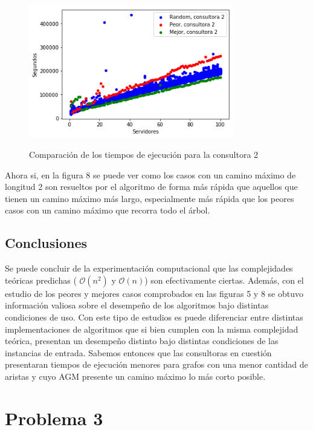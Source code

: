 \documentclass[A4paper,oneside,fleqn,11pt]{article}
\theoremstyle{definition}
\begin{document}
\begin{figure}[H] %
    \includegraphics[width=0.8\textwidth]{graficosEj2/prm2}
    \label{ni se pa que sirve esto}
    \caption{Comparación de los tiempos de ejecución para la consultora 2}
\end{figure}

Ahora si, en la figura 8 se puede ver como los casos con un camino máximo de longitud 2 son resueltos por el algoritmo de forma más rápida que aquellos que tienen un camino máximo más largo, especialmente más rápida que los peores casos con un camino máximo que recorra todo el árbol.

\subsection{Conclusiones}

Se puede concluir de la experimentación computacional que las complejidades teóricas predichas ( $\mathcal{O} (n^2)$ y  $\mathcal{O} (n)$)  son efectivamente ciertas. Además, con el estudio de los peores y mejores casos comprobados en las figuras 5 y 8 se obtuvo información valiosa sobre el desempeño de los algoritmos bajo distintas condiciones de uso. Con este tipo de estudios es puede diferenciar entre distintas implementaciones de algoritmos que si bien cumplen con la misma complejidad teórica, presentan un desempeño distinto bajo distintas condiciones de las instancias de entrada. Sabemos entonces que las consultoras en cuestión presentaran tiempos de ejecución menores para grafos con una menor cantidad de aristas y cuyo AGM presente un camino máximo lo más corto posible.


\section{Problema 3}
\end{document}

